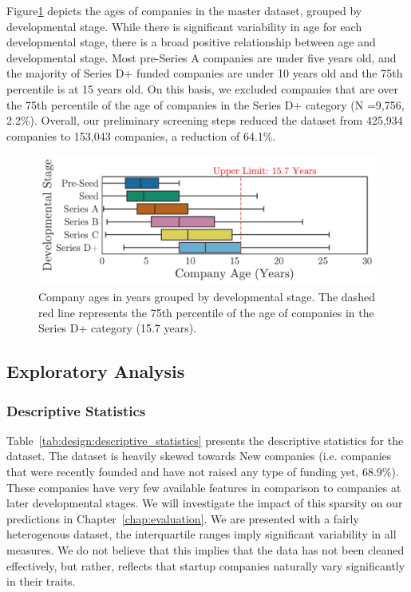 \documentclass[../thesis/thesis.tex]{subfiles}
\begin{document}
Figure\ref{fig:design:stages_ages} depicts the ages of companies in the master dataset, grouped by developmental stage. While there is significant variability in age for each developmental stage, there is a broad positive relationship between age and developmental stage. Most pre-Series A companies are under five years old, and the majority of Series D+ funded companies are under 10 years old and the 75th percentile is at 15 years old. On this basis, we excluded companies that are over the 75th percentile of the age of companies in the Series D+ category (N =9,756, 2.2\%). Overall, our preliminary screening steps reduced the dataset from 425,934 companies to 153,043 companies, a reduction of 64.1\%.

\begin{figure}[!htb]
    \centering
    \includegraphics[width=\textwidth]{../figures/design/descriptives_ages_stage}
    \caption[Company age distribution]{Company ages in years grouped by developmental stage. The dashed red line represents the 75th percentile of the age of companies in the Series D+ category (15.7 years).}
    \label{fig:design:stages_ages}
\end{figure}

\subsection{Exploratory Analysis}

\subsubsection{Descriptive Statistics}

Table~\ref{tab:design:descriptive_statistics} presents the descriptive statistics for the dataset. The dataset is heavily skewed towards New companies (i.e. companies that were recently founded and have not raised any type of funding yet, 68.9\%). These companies have very few available features in comparison to companies at later developmental stages. We will investigate the impact of this sparsity on our predictions in Chapter~\ref{chap:evaluation}. We are presented with a fairly heterogenous dataset, the interquartile ranges imply significant variability in all measures. We do not believe that this implies that the data has not been cleaned effectively, but rather, reflects that startup companies naturally vary significantly in their traits.
\end{document}
